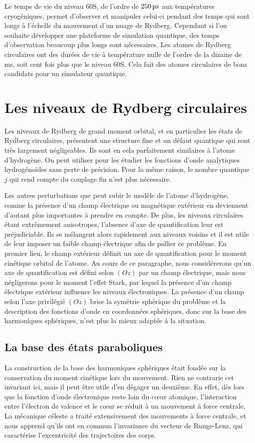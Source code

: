 Le temps de vie du niveau 60S, de l'ordre de $\SIvv{250}{\us}$ aux températures cryogéniques, permet d'observer et manipuler celui-ci pendant des temps qui sont longs à l'échelle du mouvement d'un nuage de Rydberg.
Cependant si l'on souhaite développer une plateforme de simulation quantique, des temps d'observation beaucoup plus longs sont nécessaires.
Les atomes de Rydberg circulaires ont des durées de vie à température nulle de l'ordre de la dizaine de \si{\ms}, soit cent fois plus que le niveau 60S.
Cela fait des atomes circulaires de bons candidats pour un simulateur quantique.

\section{Les niveaux de Rydberg circulaires}\label{sec:circ_parabol}
\noindent Les niveaux de Rydberg de grand moment orbital, et en particulier les états de Rydberg circulaires, présentent une structure fine et un défaut quantique qui sont très largement négligeables.
Ils sont en cela parfaitement similaires à l'atome d'hydrogène.
On peut utiliser pour les étudier les fonctions d'onde analytiques hydrogénoïdes sans perte de précision.
Pour la même raison, le nombre quantique $j$ qui rend compte du couplage fin n'est plus nécessaire.

Les autres perturbations que peut subir le modèle de l'atome d'hydrogène, comme la présence d'un champ électrique ou magnétique extérieur en deviennent d'autant plus importantes à prendre en compte.
De plus, les niveaux circulaires étant extrêmement anisotropes, l'absence d'axe de quantification leur est préjudiciable.
Ils se mélangent alors rapidement aux niveaux voisins et il est utile de leur imposer un faible champ électrique afin de pallier ce problème.
En premier lieu, le champ extérieur définit un axe de quantification pour le moment cinétique orbital de l'atome.
Au cours de ce paragraphe, nous considérerons qu'un axe de quantification est défini selon $(Oz)$ par un champ électrique, mais nous négligerons pour le moment l'effet Stark, par lequel la présence d'un champ électrique extérieur influence les niveaux électroniques.
La présence d'un champ selon l'axe privilégié $(Oz)$ brise la symétrie sphérique du problème et la description des fonctions d'onde en coordonnées sphériques, donc sur la base des harmoniques sphériques, n'est plus la mieux adaptée à la situation.

\subsection{La base des états paraboliques}
\noindent	La construction de la base des harmoniques sphériques était fondée sur la conservation du moment cinétique lors du mouvement.
Rien ne contrarie cet invariant ici, mais il peut être utile d'en dégager un deuxième.
En effet, dès lors que la fonction d'onde électronique reste loin du c\oe ur atomique, l'interaction entre l'électron de valence et le c\oe ur se réduit à un mouvement à force centrale.
La mécanique céleste a traité extensivement des mouvements à force centrale, et nous apprend qu'ils ont en commun l'invariance du vecteur de Runge-Lenz, qui caractérise l'excentricité des trajectoires des corps.

